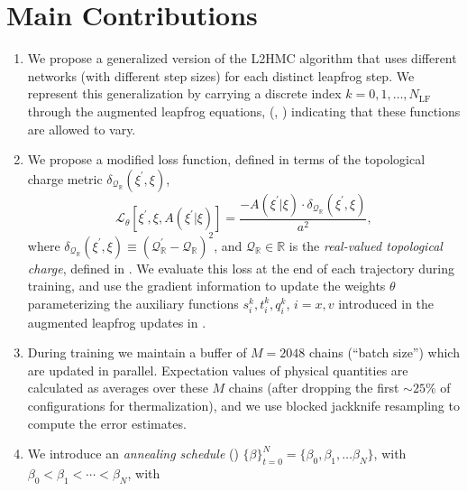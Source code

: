 \documentclass{article} %
\begin{document}
\section{\label{sec:main_contributions}Main Contributions}
\begin{enumerate}
   \item We propose a generalized version of the L2HMC algorithm that uses different networks (with different step
      sizes) for each distinct leapfrog step.
      We represent this generalization by carrying a discrete index \(k = 0, 1, \ldots, N_{\mathrm{LF}}\) through the
      augmented leapfrog equations, (, ) indicating that
      these functions are allowed to vary.
   \item We propose a modified loss function, defined in terms of the topological charge metric
      \(\delta_{\mathcal{Q}_{\mathbb{R}}}(\xi^{\prime}, \xi)\),
      \begin{equation}
         \mathcal{L}_{\theta}{\left[\xi^{\prime},\xi,A(\xi^{\prime}|\xi)\right]} =%
         \frac{-A(\xi^{\prime}|\xi)\cdot \delta_{\mathcal{Q}_{\mathbb{R}}}(\xi^{\prime},\xi)}{a^{2}},
      \end{equation}
      where \(\delta_{\mathcal{Q}_{\mathbb{R}}}(\xi^{\prime}, \xi) \equiv
      {\left(\mathcal{Q}_{\mathbb{R}}^{\prime}-\mathcal{Q}_{\mathbb{R}}\right)}^{2}\), and
      \(\mathcal{Q}_{\mathbb{R}}\in\mathbb{R}\) is the \emph{real-valued topological charge}, defined in
      .
      We evaluate this loss at the end of each trajectory during training, and use the gradient information to update
      the weights \(\theta\) parameterizing the auxiliary functions \(s^{k}_{i}, t^{k}_{i}, q^{k}_{i}\), \(i = x, v\)
      introduced in the augmented leapfrog updates in .
   \item During training we maintain a buffer of \(M = 2048\) chains (``batch size'') which are updated in parallel.
      Expectation values of physical quantities are calculated as averages over these \(M\) chains (after dropping the
      first \(\sim25\%\) of configurations for thermalization), and we use blocked jackknife resampling to compute
      the error estimates.
   \item We introduce an \emph{annealing schedule} () \({\{\beta\}}_{t=0}^{N} =
      \{\beta_{0}, \beta_{1}, \ldots \beta_{N}\}\), with \(\beta_{0} < \beta_{1} < \cdots < \beta_{N}\), with

\end{enumerate}
\end{document}
